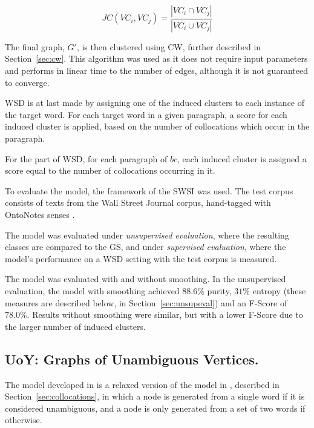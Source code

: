 \begin{equation}\label{eq:jc}
 JC(VC_i, VC_j) = \frac{|VC_i \cap VC_j|}
                       {|VC_i \cup VC_j|}
\end{equation}

The final graph, $G'$, is then clustered using \ac{CW}, further described in
Section~\ref{sec:cw}. This algorithm was used as it does not require input
parameters and performs in linear time to the number of edges, although it is
not guaranteed to converge.

\ac{WSD} is at last made by assigning one of the induced clusters to each
instance of the target word. For each target word in a given paragraph, a score
for each induced cluster is applied, based on the number of collocations which
occur in the paragraph.

For the part of \ac{WSD}, for each paragraph of $bc$, each induced cluster is
assigned a score equal to the number of collocations occurring in it.

To evaluate the model, the framework of the \ac{SWSI} \cite{agirre2007semeval}
was used. The test corpus consists of texts from the Wall Street Journal
corpus, hand-tagged with OntoNotes senses \cite{hovy2006ontonotes}.

The model was evaluated under \textit{unsupervised evaluation}, where the
resulting classes are compared to the \ac{GS}, and under \textit{supervised
evaluation}, where the model's performance on a \ac{WSD} setting with the
test corpus is measured.

The model was evaluated with and without smoothing. In the unsupervised
evaluation, the model with smoothing achieved $88.6\%$ purity, $31\%$ entropy
(these measures are described below, in Section~\ref{sec:unsupeval}) and an
F-Score of $78.0\%$. Results without smoothing were similar, but with a lower
F-Score due to the larger number of induced clusters.

\subsection{UoY: Graphs of Unambiguous Vertices.}

The model developed in \cite{korkontzelos2010uoy} is a relaxed version of the
model in \cite{klapaftis2008word}, described in Section~\ref{sec:collocations},
in which a node is generated from a single word if it is considered unambiguous,
and a node is only generated from a set of two words if otherwise.


